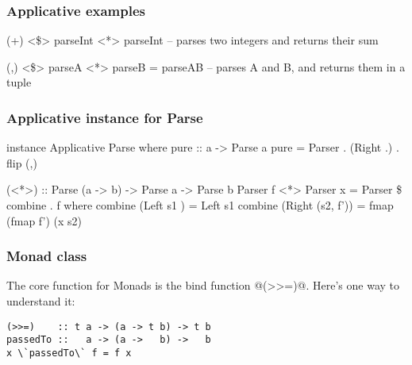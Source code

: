 \documentclass{beamer}
\begin{document}
\begin{frame}
\frametitle{Applicative examples}
(+) <\$> parseInt <*> parseInt
-- parses two integers and returns their sum

(,) <\$> parseA <*> parseB = parseAB
-- parses A and B, and returns them in a tuple
\end{frame}


%
%
%


\begin{frame}
\frametitle{Applicative instance for Parse}
instance Applicative Parse where
  pure :: a -> Parse a
  pure = Parser . (Right .) . flip (,)

  (<*>) :: Parse (a -> b) -> Parse a -> Parse b
  Parser f <*> Parser x = Parser \$ combine . f
    where
      combine (Left   s1     ) = Left      s1
      combine (Right (s2, f')) = fmap (fmap f') (x s2)
\end{frame}


%
%
%
%
%
%


\begin{frame}

\frametitle{Monad class}
The core function for Monads is the bind function @(>>=)@. Here's one way to understand it:

\begin{lstlisting}
(>>=)    :: t a -> (a -> t b) -> t b
passedTo ::   a -> (a ->   b) ->   b
x \`passedTo\` f = f x
\end{lstlisting}



\end{frame}
\end{document}
